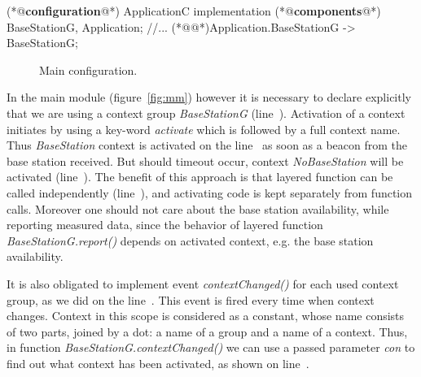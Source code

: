 \begin{Sbox}
\begin{minipage}{\columnwidth}
\begin{csource}
(*@\textbf{configuration}@*) ApplicationC {
}implementation {
  (*@\textbf{components}@*) BaseStationG, Application;
  //...
  (*@@*)Application.BaseStationG -> BaseStationG;
}
\end{csource}
\end{minipage}
\end{Sbox}
\begin{figure}[!h]
 \TheSbox
 \caption{Main configuration.}
 \label{fig:mc}
\end{figure}

In the main module (figure~\ref{fig:mm}) however it is necessary to declare explicitly that we are using a context group \emph{BaseStationG} (line~). Activation of a context initiates by using a key-word \emph{activate} which is followed by a full context name. Thus \emph{BaseStation} context is activated on the line~ as soon as a beacon from the base station received. But should timeout occur, context \emph{NoBaseStation} will be activated (line~). The benefit of this approach is that layered function can be called independently (line~), and activating code is kept separately from function calls. Moreover one should not care about the base station availability, while reporting measured data, since the behavior of layered function \emph{BaseStationG.report()} depends on activated context, e.g. the base station availability.

It is also obligated to implement event \emph{contextChanged()} for each used context group, as we did on the line~. This event is fired every time when context changes. Context in this scope is considered as a constant, whose name consists of two parts, joined by a dot: a name of a group and a name of a context. Thus, in function \emph{BaseStationG.contextChanged()} we can use a passed parameter \emph{con} to find out what context has been activated, as shown on line~.

